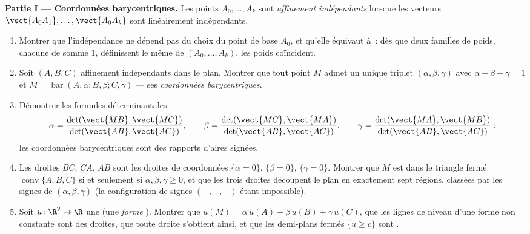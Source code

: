 \begin{problem}
\medskip
\noindent\textbf{Partie I --- Coordonnées barycentriques.} Les points
$A_0, \dots, A_k$ sont \emph{affinement indépendants} lorsque les
vecteurs $\vect{A_0A_1}, \dots, \vect{A_0A_k}$ sont linéairement
indépendants.
\begin{enumerate}
  \item Montrer que l'indépendance  ne dépend pas du
        choix du point de base $A_0$, et qu'elle équivaut à~:
        dès que deux familles de poids, chacune
        de somme $1$, définissent le même  de $(A_0,
        \dots, A_k)$, les poids coïncident.
  \item Soit $(A, B, C)$ affinement indépendants dans le plan.
        Montrer que tout point $M$ admet un unique triplet
        $(\alpha, \beta, \gamma)$ avec $\alpha + \beta +
        \gamma = 1$ et $M = \operatorname{bar}(A, \alpha; B,
        \beta; C, \gamma)$ --- ses \emph{coordonnées
        barycentriques}.
  \item Démontrer les formules déterminantales
        \[
        \alpha = \frac{\det(\vect{MB},
        \vect{MC})}{\det(\vect{AB}, \vect{AC})},
        \qquad
        \beta = \frac{\det(\vect{MC},
        \vect{MA})}{\det(\vect{AB}, \vect{AC})},
        \qquad
        \gamma = \frac{\det(\vect{MA},
        \vect{MB})}{\det(\vect{AB}, \vect{AC})} :
        \]
        les coordonnées barycentriques sont des rapports d'aires
        signées.
  \item Les droites $BC$, $CA$, $AB$ sont les droites de
        coordonnées $\{\alpha = 0\}$, $\{\beta = 0\}$, $\{\gamma = 0\}$.
        Montrer que $M$ est dans le triangle fermé
        $\operatorname{conv}\{A, B, C\}$ si et seulement si $\alpha,
        \beta, \gamma \geq 0$, et que les trois droites découpent le
        plan en exactement sept régions, classées par les signes de
        $(\alpha, \beta, \gamma)$ (la configuration de signes $(-, -,
        -)$ étant impossible).
  \item Soit $u \colon \R^2 \to \R$ une  (une
        \emph{forme }). Montrer que $u(M) = \alpha\,u(A) +
        \beta\,u(B) + \gamma\,u(C)$, que les lignes de niveau d'une
        forme  non constante sont des droites, que toute droite
        s'obtient ainsi, et que les demi-plans fermés $\{u
        \geq c\}$ sont .
\end{enumerate}


\end{problem}
